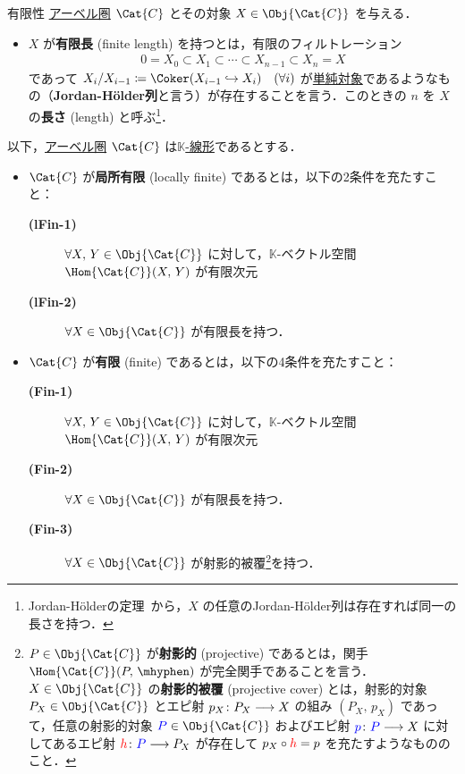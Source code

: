 \documentclass[TQFT_main]{subfiles}
\begin{document}
    \begin{mydef}[label=def:finite-abcat]{有限性}
        \hyperref[def:additive-cat]{アーベル圏} $\Cat{C}$ とその対象 $X \in \Obj{\Cat{C}}$ を与える．
        \begin{itemize}
            \item $X$ が\textbf{有限長} (finite length) を持つとは，有限のフィルトレーション
            \begin{align}
                0 = X_0 \subset X_1 \subset \cdots \subset X_{n-1} \subset X_n = X
            \end{align}
            であって $X_i/X_{i-1} \coloneqq \Coker (X_{i-1} \hookrightarrow X_i) \quad (\forall i)$ が\hyperref[def:semisimple-cat]{単純対象}であるようなもの（\textbf{Jordan-H\"{o}lder列}と言う）が存在することを言う．このときの $n$ を $X$ の\textbf{長さ} (length) と呼ぶ\footnote{Jordan-H\"{o}lderの定理~\cite[THEOREM 1.5.4, p.5]{etingof2015tensor}から，$X$ の任意のJordan-H\"{o}lder列は存在すれば同一の長さを持つ．}．
        \end{itemize}
        以下，\hyperref[def:additive-cat]{アーベル圏} $\Cat{C}$ は\hyperref[def:additive-cat]{$\mathbb{K}$-線形}であるとする．
        \begin{itemize}
            \item $\Cat{C}$ が\textbf{局所有限} (locally finite) であるとは，以下の2条件を充たすこと：
            \begin{description}
                \item[\textbf{(lFin-1)}] $\forall X,\, Y \in \Obj{\Cat{C}}$ に対して，$\mathbb{K}$-ベクトル空間 $\Hom{\Cat{C}}(X,\, Y)$ が有限次元
                \item[\textbf{(lFin-2)}] $\forall X \in \Obj{\Cat{C}}$ が有限長を持つ．
            \end{description}
            \item $\Cat{C}$ が\textbf{有限} (finite) であるとは，以下の4条件を充たすこと：
            \begin{description}
                \item[\textbf{(Fin-1)}] $\forall X,\, Y \in \Obj{\Cat{C}}$ に対して，$\mathbb{K}$-ベクトル空間 $\Hom{\Cat{C}}(X,\, Y)$ が有限次元
                \item[\textbf{(Fin-2)}] $\forall X \in \Obj{\Cat{C}}$ が有限長を持つ．
                \item[\textbf{(Fin-3)}] $\forall X \in \Obj{\Cat{C}}$ が射影的被覆\footnote{$P \in \Obj{\Cat{C}}$ が\textbf{射影的} (projective) であるとは，関手 $\Hom{\Cat{C}}(P,\, \mhyphen)$ が完全関手であることを言う．$X \in \Obj{\Cat{C}}$ の\textbf{射影的被覆} (projective cover) とは，射影的対象 $P_X \in \Obj{\Cat{C}}$ とエピ射 $p_X \colon P_X \longrightarrow X$ の組み $(P_X,\, p_X)$ であって，任意の射影的対象 $\textcolor{blue}{P} \in \Obj{\Cat{C}}$ およびエピ射 $\textcolor{blue}{p} \colon \textcolor{blue}{P} \longrightarrow X$ に対してあるエピ射 $\textcolor{red}{h} \colon \textcolor{blue}{P} \longrightarrow P_X$ が存在して $p_X \circ \textcolor{red}{h} = p$ を充たすようなもののこと．}を持つ．

\end{description}
\end{itemize}
\end{mydef}
\end{document}
